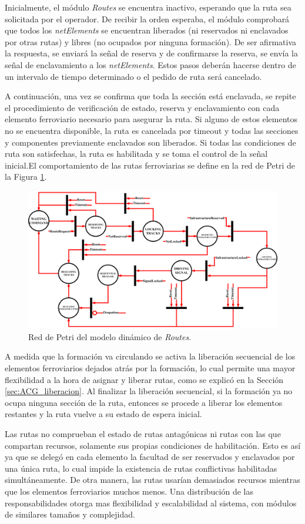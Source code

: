 	Inicialmente, el módulo \textit{Routes} se encuentra inactivo, esperando que la ruta sea solicitada por el operador. De recibir la orden esperaba, el módulo comprobará que todos los \textit{netElements} se encuentran liberados (ni reservados ni enclavados por otras rutas) y libres (no ocupados por ninguna formación). De ser afirmativa la respuesta, se enviará la señal de reserva y de confirmarse la reserva, se envía la señal de enclavamiento a los \textit{netElements}. Estos pasos deberán hacerse dentro de un intervalo de tiempo determinado o el pedido de ruta será cancelado.
	
	A continuación, una vez se confirma que toda la sección está enclavada, se repite el procedimiento de verificación de estado, reserva y enclavamiento con cada elemento ferroviario necesario para asegurar la ruta. Si alguno de estos elementos no se encuentra disponible, la ruta es cancelada por timeout y todas las secciones y componentes previamente enclavados son liberados. Si todas las condiciones de ruta son satisfechas, la ruta es habilitada y se toma el control de la señal inicial.El comportamiento de las rutas ferroviarias se define en la red de Petri de la Figura \ref{fig:RTS_Petri}.
	
	\begin{figure}[H]
		\centering
		\includegraphics[width=1\textwidth]{Figuras/RTS_petri}
		\centering\caption{Red de Petri del modelo dinámico de \textit{Routes}.}
		\label{fig:RTS_Petri}
	\end{figure}
	
	A medida que la formación va circulando se activa la liberación secuencial de los elementos ferroviarios dejados atrás por la formación, lo cual permite una mayor flexibilidad a la hora de asignar y liberar rutas, como se explicó en la Sección \ref{sec:ACG_liberacion}. Al finalizar la liberación secuencial, si la formación ya no ocupa ninguna sección de la ruta, entonces se procede a liberar los elementos restantes y la ruta vuelve a su estado de espera inicial.
	
	Las rutas no comprueban el estado de rutas antagónicas ni rutas con las que compartan recursos, solamente sus propias condiciones de habilitación. Esto es así ya que se delegó en cada elemento la facultad de ser reservados y enclavados por una única ruta, lo cual impide la existencia de rutas conflictivas habilitadas simultáneamente. De otra manera, las rutas usarían demasiados recursos mientras que los elementos ferroviarios muchos menos. Una distribución de las responsabilidades otorga mas flexibilidad y escalabilidad al sistema, con módulos de similares tamaños y complejidad.